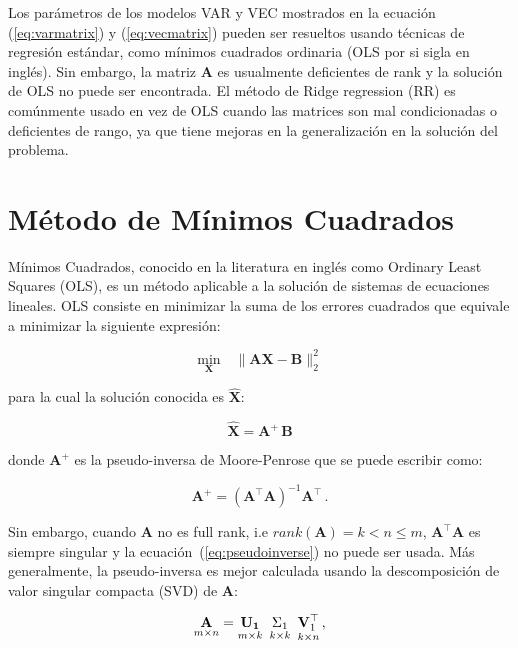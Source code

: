 Los parámetros de los modelos VAR y VEC mostrados en la ecuación
(\ref{eq:varmatrix}) y (\ref{eq:vecmatrix}) pueden ser resueltos usando
técnicas de regresión estándar, como mínimos cuadrados ordinaria (OLS por si
sigla en inglés). Sin embargo, la matriz $\mathbf{A}$ es usualmente deficientes
de rank y la solución de OLS no puede ser encontrada.  El método de Ridge
regression (RR) es comúnmente usado en vez de OLS cuando las matrices son mal
condicionadas o deficientes de rango, ya que tiene mejoras en la generalización
en la solución del problema.

\section{Método de Mínimos Cuadrados}
Mínimos Cuadrados, conocido en la literatura en inglés como Ordinary Least Squares (OLS), 
es un método aplicable a la solución de sistemas de ecuaciones lineales. OLS consiste en minimizar
la suma de los errores cuadrados que equivale a minimizar la siguiente expresión:

\begin{equation}
\label{eq:regressionproblem}
\underset{\mathbf{X}}{\text{min}} \quad \| \mathbf{A}\mathbf{\mathbf{X}} - \mathbf{B} \|_2^2
\end{equation}

\noindent para la cual la solución conocida es $\hat{\mathbf{X}}$:

\begin{equation}
\label{eq:MP}
\hat{\mathbf{X}}=\mathbf{A}^{\!\!+}\,\mathbf{B}
\end{equation}

\noindent donde $\mathbf{A}^{\!\!+}$ es la pseudo-inversa de Moore-Penrose que se puede escribir como:

\begin{equation}
\label{eq:pseudoinverse}
\mathbf{A}^{\!\!+}= (\mathbf{A}^{\!\!\top} \mathbf{A})^{-1}\mathbf{A}^{\!\!\top} \, .
\end{equation}

Sin embargo, cuando $\mathbf{A}$ no es full rank, i.e 
$rank(\mathbf{A})=k <  n \leq m$, $\mathbf{A}^\top \mathbf{A}$ es siempre singular
y la ecuación~(\ref{eq:pseudoinverse}) no puede ser usada. Más generalmente,
la pseudo-inversa es mejor calculada usando la descomposición de valor singular compacta (SVD)
de $\mathbf{A}$:

\begin{equation}
    \label{eq:compactsvd}
    \underset{m \times n}{\mathbf{A}}=
    \underset{m \times k}{\mathbf{U_1}} \enskip
    \underset{k \times k}{\Sigma_1} \enskip
    \underset{k \times n}{\mathbf{V}_1^{\top}} \, ,
\end{equation}

